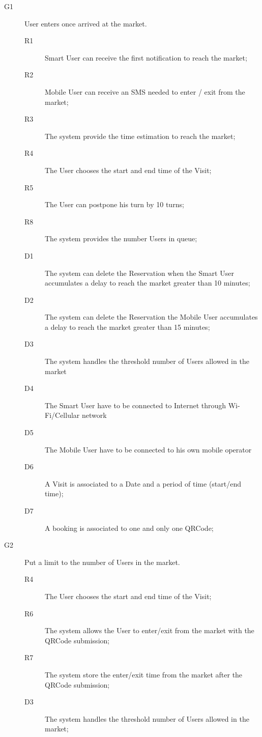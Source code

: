 \begin{description}
    \item[G1]User enters once arrived at the market.
    
    \begin{description}
    \item[R1] Smart User can receive the first notification to reach the market; 
    \item[R2] Mobile User can receive an SMS needed to enter / exit from the market;   %
    \item[R3] The system provide the time estimation to reach the market;
    \item[R4] The User chooses the start and end time of the Visit;
    \item[R5] The User can postpone his turn by 10 turns;
    \item[R8] The system provides the number Users in queue; %
    \item[D1] The system can delete the Reservation when the Smart User accumulates a delay to reach the market greater than 10 minutes; 
    \item[D2] The system can delete the Reservation the Mobile User accumulates a delay to reach the market greater than 15 minutes; 
    \item[D3] The system handles the threshold number of Users allowed in the market
    \item[D4] The Smart User have to be connected to Internet through Wi-Fi/Cellular network
    \item[D5] The Mobile User have to be connected to his own mobile operator
    \item[D6] A Visit is associated to a Date and a period of time (start/end time); 
    \item[D7] A booking is associated to one and only one QRCode;  
    \end{description}
    
    \item[G2]Put a limit to the number of Users in the market.
    
    \begin{description}
    \item[R4] The User chooses the start and end time of the Visit;
    \item[R6] The system allows the User to enter/exit from the market with the QRCode submission; 
    \item[R7] The system store the enter/exit time from the market after the QRCode submission; 
    \item[D3] The system handles the threshold number of Users allowed in the market;
    \end{description}
    

\end{description}
